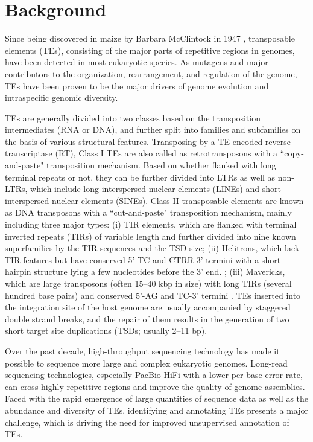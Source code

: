 \documentclass{bmcart}
\begin{document}

\section*{Background}
Since being discovered in maize by Barbara McClintock in 1947 \cite{mcclintock1947mutable, mcclintock1950origin}, transposable elements (TEs), consisting of the major parts of repetitive regions in genomes, have been detected in most eukaryotic species\cite{bourque2018ten, wells2020field}. As mutagens and major contributors to the organization, rearrangement, and regulation of the genome, TEs have been proven to be the major drivers of genome evolution and intraspecific genomic diversity\cite{quesneville2020twenty, kalendar2021mobile, kazazian2004mobile}.

TEs are generally divided into two classes based on the transposition intermediates (RNA or DNA)\cite{finnegan1989eukaryotic}, and further split into families and subfamilies on the basis of various structural features\cite{wicker2007unified}. Transposing by a TE-encoded reverse transcriptase (RT), Class I TEs are also called as retrotransposons with a ``copy-and-paste" transposition mechanism. Based on whether flanked with long terminal repeats or not, they can be further divided into LTRs as well as non-LTRs, which include long interspersed nuclear elements (LINEs) and short interspersed nuclear elements (SINEs). Class II transposable elements are known as DNA transposons with a ``cut-and-paste" transposition mechanism, mainly including three major types: (i) TIR elements, which are flanked with terminal inverted repeats (TIRs) of variable length and further divided into nine known superfamilies by the TIR sequences and the TSD size\cite{wicker2007unified}; (ii) Helitrons, which lack TIR features but have conserved 5'-TC and CTRR-3' termini with a short hairpin structure lying a few nucleotides before the 3' end.  \cite{kapitonov2007helitrons}; (iii) Mavericks, which are large transposons (often 15–40 kbp in size) with long TIRs (several hundred base pairs) and conserved 5'-AG and TC-3' termini \cite{su2019tir}. TEs inserted into the integration site of the host genome are usually accompanied by staggered double strand breaks, and the repair of them results in the generation of two short target site duplications (TSDs; usually 2–11 bp)\cite{peterson2013mechanism}.

Over the past decade, high-throughput sequencing technology has made it possible to sequence more large and complex eukaryotic genomes\cite{nurk2022complete}. Long-read sequencing technologies, especially PacBio HiFi with a lower per-base error rate, can cross highly repetitive regions and improve the quality of genome assemblies\cite{yasir2022long}. Faced with the rapid emergence of large quantities of sequence data as well as the abundance and diversity of TEs, identifying and annotating TEs presents a major challenge, which is driving the need for improved unsupervised annotation of TEs.
\end{document}
